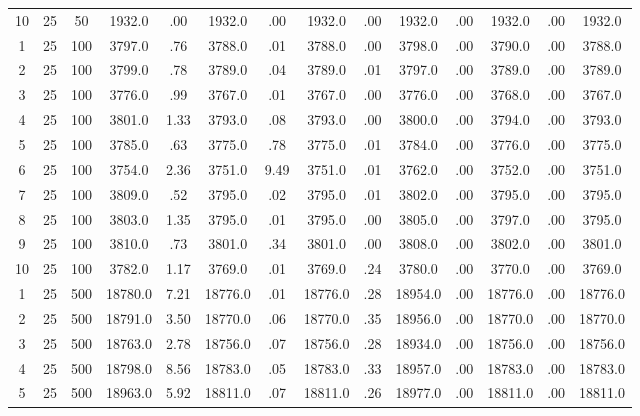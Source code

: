 \documentclass[12pt,a4paper]{article}
\begin{document}
\begin{center}
{\begin{tabular}{|ccc|cc|cc|cc|cc|cc|c|}
10            &  25&  50&   1932.0&  .00&   1932.0&  .00&   1932.0&  .00&   1932.0&  .00&   1932.0&  .00&   1932.0\\[-0.01in]
1             &  25& 100&   3797.0&  .76&   3788.0&  .01&   3788.0&  .00&   3798.0&  .00&   3790.0&  .00&   3788.0\\[-0.01in]
2             &  25& 100&   3799.0&  .78&   3789.0&  .04&   3789.0&  .01&   3797.0&  .00&   3789.0&  .00&   3789.0\\[-0.01in]
3             &  25& 100&   3776.0&  .99&   3767.0&  .01&   3767.0&  .00&   3776.0&  .00&   3768.0&  .00&   3767.0\\[-0.01in]
4             &  25& 100&   3801.0& 1.33&   3793.0&  .08&   3793.0&  .00&   3800.0&  .00&   3794.0&  .00&   3793.0\\[-0.01in]
5             &  25& 100&   3785.0&  .63&   3775.0&  .78&   3775.0&  .01&   3784.0&  .00&   3776.0&  .00&   3775.0\\[-0.01in]
6             &  25& 100&   3754.0& 2.36&   3751.0& 9.49&   3751.0&  .01&   3762.0&  .00&   3752.0&  .00&   3751.0\\[-0.01in]
7             &  25& 100&   3809.0&  .52&   3795.0&  .02&   3795.0&  .01&   3802.0&  .00&   3795.0&  .00&   3795.0\\[-0.01in]
8             &  25& 100&   3803.0& 1.35&   3795.0&  .01&   3795.0&  .00&   3805.0&  .00&   3797.0&  .00&   3795.0\\[-0.01in]
9             &  25& 100&   3810.0&  .73&   3801.0&  .34&   3801.0&  .00&   3808.0&  .00&   3802.0&  .00&   3801.0\\[-0.01in]
10            &  25& 100&   3782.0& 1.17&   3769.0&  .01&   3769.0&  .24&   3780.0&  .00&   3770.0&  .00&   3769.0\\[-0.01in]
1             &  25& 500&  18780.0& 7.21&  18776.0&  .01&  18776.0&  .28&  18954.0&  .00&  18776.0&  .00&  18776.0\\[-0.01in]
2             &  25& 500&  18791.0& 3.50&  18770.0&  .06&  18770.0&  .35&  18956.0&  .00&  18770.0&  .00&  18770.0\\[-0.01in]
3             &  25& 500&  18763.0& 2.78&  18756.0&  .07&  18756.0&  .28&  18934.0&  .00&  18756.0&  .00&  18756.0\\[-0.01in]
4             &  25& 500&  18798.0& 8.56&  18783.0&  .05&  18783.0&  .33&  18957.0&  .00&  18783.0&  .00&  18783.0\\[-0.01in]
5             &  25& 500&  18963.0& 5.92&  18811.0&  .07&  18811.0&  .26&  18977.0&  .00&  18811.0&  .00&  18811.0\\[-0.01in]

\end{tabular}}
\end{center}
\end{document}
